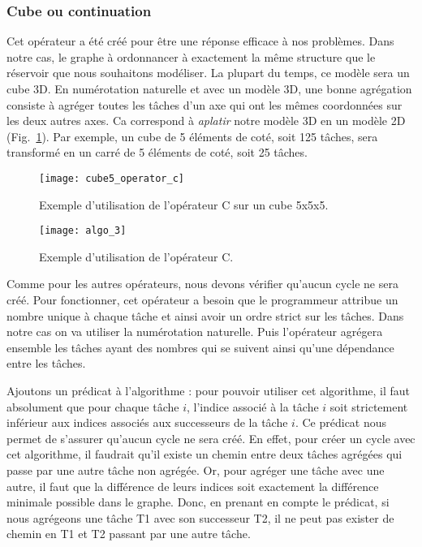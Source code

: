 \subsubsection{Cube ou continuation}
Cet opérateur a été créé pour être une réponse efficace à nos problèmes.
%
Dans notre cas, le graphe à ordonnancer à exactement la même structure que le réservoir que nous souhaitons modéliser.
%
La plupart du temps, ce modèle sera un cube 3D.
%
En numérotation naturelle et avec un modèle 3D, une bonne agrégation consiste à agréger toutes les tâches d'un axe qui ont les mêmes coordonnées sur les deux autres axes.
%
Ca correspond à {\em aplatir} notre modèle 3D en un modèle 2D (Fig.~\ref{fig:cube5_algo_C}).
%
Par exemple, un cube de 5 éléments de coté, soit 125 tâches, sera transformé en un carré de 5 éléments de coté, soit 25 tâches.


\begin{figure}[t!]
  \centering
  \texttt{[image: cube5\_operator\_c]}
  \caption{Exemple d'utilisation de l'opérateur C sur un cube 5x5x5.}
  \label{fig:cube5_algo_C}
\end{figure}


\begin{figure}[t!]
  \centering
  \texttt{[image: algo\_3]}
  \caption{Exemple d'utilisation de l'opérateur C.}
  \label{fig:algo_C}
\end{figure}


Comme pour les autres opérateurs, nous devons vérifier qu'aucun cycle ne sera créé.
%
Pour fonctionner, cet opérateur a besoin que le programmeur attribue un nombre unique à chaque tâche et ainsi avoir un ordre strict sur les tâches.
%
Dans notre cas on va utiliser la numérotation naturelle.
%
Puis l'opérateur agrégera ensemble les tâches ayant des nombres qui se suivent ainsi qu'une dépendance entre les tâches.

Ajoutons un prédicat à l'algorithme : pour pouvoir utiliser cet algorithme, il faut absolument que pour chaque tâche $i$, l'indice associé à la tâche $i$ soit strictement inférieur aux indices associés aux successeurs de la tâche $i$.
%
Ce prédicat nous permet de s'assurer qu'aucun cycle ne sera créé.
%
En effet, pour créer un cycle avec cet algorithme, il faudrait qu'il existe un chemin entre deux tâches agrégées qui passe par une autre tâche non agrégée.
%
Or, pour agréger une tâche avec une autre, il faut que la différence de leurs indices soit exactement la différence minimale possible dans le graphe.
%
Donc, en prenant en compte le prédicat, si nous agrégeons une tâche T1 avec son successeur T2, il ne peut pas exister de chemin en T1 et T2 passant par une autre tâche.


